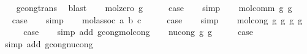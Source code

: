 \begin{isabellebody}
\ \ \isamarkupfalse%
\ gcong{\isachardot}{\kern0pt}trans\ \isamarkupfalse%
\ blast\isanewline
{}\isamarkupfalse%
\isanewline
\ \ \isamarkupfalse%
\ {\isacharparenleft}{\kern0pt}mol{\isacharunderscore}{\kern0pt}zero\ g{\isacharparenright}{\kern0pt}\isanewline
\ \ \isamarkupfalse%
\ \isamarkupfalse%
\ {\isacharquery}{\kern0pt}case\isanewline
\ \ \isamarkupfalse%
\ simp\isanewline
{}\isamarkupfalse%
\isanewline
\ \ \isamarkupfalse%
\ {\isacharparenleft}{\kern0pt}mol{\isacharunderscore}{\kern0pt}comm\ g{}\ g{}{\isacharparenright}{\kern0pt}\isanewline
\ \ \isamarkupfalse%
\ \isamarkupfalse%
\ {\isacharquery}{\kern0pt}case\isanewline
\ \ \isamarkupfalse%
\ simp\isanewline
{}\isamarkupfalse%
\isanewline
\ \ \isamarkupfalse%
\ {\isacharparenleft}{\kern0pt}mol{\isacharunderscore}{\kern0pt}assoc\ a\ b\ c{\isacharparenright}{\kern0pt}\isanewline
\ \ \isamarkupfalse%
\ \isamarkupfalse%
\ {\isacharquery}{\kern0pt}case\isanewline
\ \ \isamarkupfalse%
\ simp\isanewline
{}\isamarkupfalse%
\isanewline
\ \ \isamarkupfalse%
\ {\isacharparenleft}{\kern0pt}mol{\isacharunderscore}{\kern0pt}cong\ g{}\ g{}{\isacharprime}{\kern0pt}\ g{}\ g{}{\isacharprime}{\kern0pt}{\isacharparenright}{\kern0pt}\isanewline
\ \ \isamarkupfalse%
\ \isamarkupfalse%
\ {\isacharquery}{\kern0pt}case\isanewline
\ \ \isamarkupfalse%
\ {\isacharparenleft}{\kern0pt}simp\ add{\isacharcolon}{\kern0pt}\ gcong{\isachardot}{\kern0pt}mol{\isacharunderscore}{\kern0pt}cong{\isacharparenright}{\kern0pt}\isanewline
{}\isamarkupfalse%
\isanewline
\ \ \isamarkupfalse%
\ {\isacharparenleft}{\kern0pt}nu{\isacharunderscore}{\kern0pt}cong\ g\ g{\isacharprime}{\kern0pt}{\isacharparenright}{\kern0pt}\isanewline
\ \ \isamarkupfalse%
\ \isamarkupfalse%
\ {\isacharquery}{\kern0pt}case\isanewline
\ \ \isamarkupfalse%
\ {\isacharparenleft}{\kern0pt}simp\ add{\isacharcolon}{\kern0pt}\ gcong{\isachardot}{\kern0pt}nu{\isacharunderscore}{\kern0pt}cong{\isacharparenright}{\kern0pt}\isanewline
{}\isamarkupfalse%
\isanewline

\end{isabellebody}
